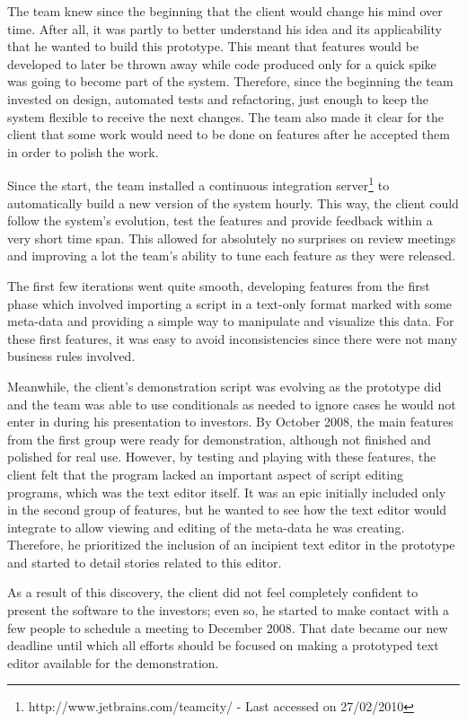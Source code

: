 \documentclass[lnbip]{svmultln}
\begin{document}
The team knew since the beginning that the client would change his
mind over time. After all, it was partly to better understand his idea
and its applicability that he wanted to build this prototype. This
meant that features would be developed to later be thrown away while
code produced only for a quick spike was going to become part of the
system. Therefore, since the beginning the team invested on design,
automated tests and refactoring, just enough to keep the system
flexible to receive the next changes. The team also made it clear for
the client that some work would need to be done on features after he
accepted them in order to polish the work.

Since the start, the team installed a continuous integration
server\footnote{http://www.jetbrains.com/teamcity/ - Last accessed on
  27/02/2010} to automatically build a new version of the system
hourly. This way, the client could follow the system's evolution, test
the features and provide feedback within a very short time span. This
allowed for absolutely no surprises on review meetings and improving a
lot the team's ability to tune each feature as they were released.

The first few iterations went quite smooth, developing features from
the first phase which involved importing a script in a text-only
format marked with some meta-data and providing a simple way
to manipulate and visualize this data. For these first features, it
was easy to avoid inconsistencies since there were not many business
rules involved.

Meanwhile, the client's demonstration script was evolving as the
prototype did and the team was able to use conditionals as needed to
ignore cases he would not enter in during his presentation to
investors. By October 2008, the main features from the first group
were ready for demonstration, although not finished and polished for
real use. However, by testing and playing with these features, the
client felt that the program lacked an important aspect of script
editing programs, which was the text editor itself. It was an epic
initially included only in the second group of features, but he wanted
to see how the text editor would integrate to allow viewing and
editing of the meta-data he was creating. Therefore, he prioritized
the inclusion of an incipient text editor in the prototype and started
to detail stories related to this editor.

As a result of this discovery, the client did not feel completely confident to
present the software to the investors; even so, he started to make contact with
a few people to schedule a meeting to December 2008. That date became our new
deadline until which all efforts should be focused on making a prototyped text
editor available for the demonstration.
\end{document}
